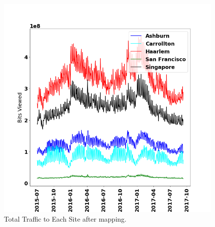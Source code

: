 \begin{figure}[h]
\centering
    \includegraphics[scale=0.35]{traffic_profile/images/ingress_hitrate_95_links_5_sites.png}
    \caption[Total Traffic to Each Site after mapping]{Total Traffic to Each Site after mapping.}
\label{ingress_hitrate_95_links}
\end{figure}